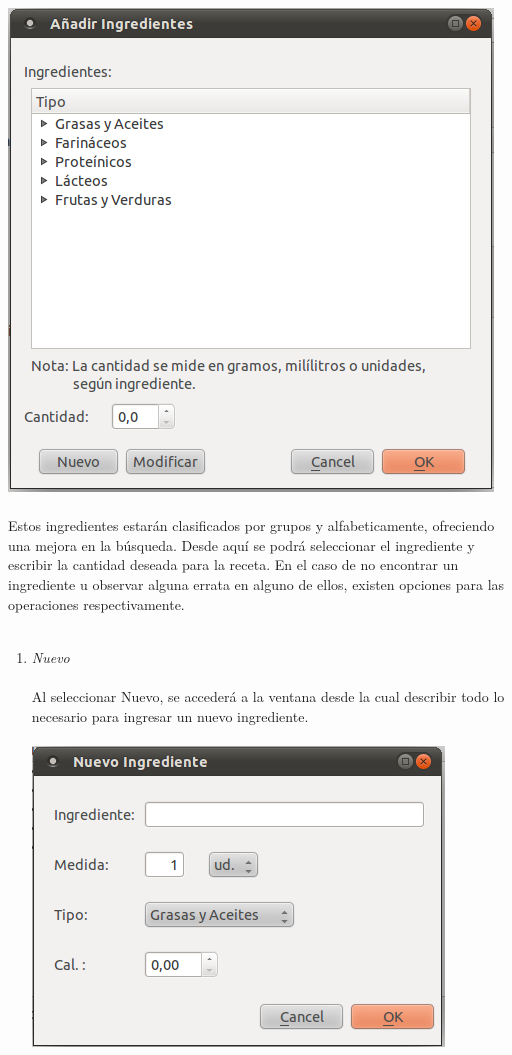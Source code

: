 \documentclass[12pt, spanish]{article}
\begin{document}
\begin{enumerate}
\begin{enumerate}
\includegraphics[scale=0.5]{Image/ingrediente-anadir.png}\\\\
Estos ingredientes estarán clasificados por grupos y alfabeticamente, ofreciendo una mejora en la búsqueda.
Desde aquí se podrá seleccionar el ingrediente y escribir la cantidad deseada para la receta.
En el caso de no encontrar un ingrediente u observar alguna errata en alguno de ellos, existen opciones para las operaciones respectivamente.\\\\
\begin{enumerate}
\item \textit{Nuevo}\\\\
Al seleccionar Nuevo, se accederá a la ventana desde la cual describir todo lo necesario para ingresar un nuevo ingrediente.\\\\
\includegraphics[scale=0.5]{Image/ingrediente-nuevo.png}\\\\

\end{enumerate}
\end{enumerate}
\end{enumerate}
\end{document}
